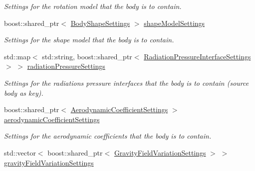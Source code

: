 \begin{DoxyCompactItemize}
\begin{DoxyCompactList}\small\item\em Settings for the rotation model that the body is to contain. \end{DoxyCompactList}\item 
boost\+::shared\+\_\+ptr$<$ \hyperlink{classtudat_1_1simulation__setup_1_1BodyShapeSettings}{Body\+Shape\+Settings} $>$ \hyperlink{structtudat_1_1simulation__setup_1_1BodySettings_aa8d0e84df13485b5f3c82c9b982ec5f0}{shape\+Model\+Settings}\hypertarget{structtudat_1_1simulation__setup_1_1BodySettings_aa8d0e84df13485b5f3c82c9b982ec5f0}{}\label{structtudat_1_1simulation__setup_1_1BodySettings_aa8d0e84df13485b5f3c82c9b982ec5f0}

\begin{DoxyCompactList}\small\item\em Settings for the shape model that the body is to contain. \end{DoxyCompactList}\item 
std\+::map$<$ std\+::string, boost\+::shared\+\_\+ptr$<$ \hyperlink{classtudat_1_1simulation__setup_1_1RadiationPressureInterfaceSettings}{Radiation\+Pressure\+Interface\+Settings} $>$ $>$ \hyperlink{structtudat_1_1simulation__setup_1_1BodySettings_a5e3ed3e841f455d2e013cf86257a39e0}{radiation\+Pressure\+Settings}\hypertarget{structtudat_1_1simulation__setup_1_1BodySettings_a5e3ed3e841f455d2e013cf86257a39e0}{}\label{structtudat_1_1simulation__setup_1_1BodySettings_a5e3ed3e841f455d2e013cf86257a39e0}

\begin{DoxyCompactList}\small\item\em Settings for the radiations pressure interfaces that the body is to contain (source body as key). \end{DoxyCompactList}\item 
boost\+::shared\+\_\+ptr$<$ \hyperlink{classtudat_1_1simulation__setup_1_1AerodynamicCoefficientSettings}{Aerodynamic\+Coefficient\+Settings} $>$ \hyperlink{structtudat_1_1simulation__setup_1_1BodySettings_ab5f5682fb9ab900be0873cbc0103973a}{aerodynamic\+Coefficient\+Settings}\hypertarget{structtudat_1_1simulation__setup_1_1BodySettings_ab5f5682fb9ab900be0873cbc0103973a}{}\label{structtudat_1_1simulation__setup_1_1BodySettings_ab5f5682fb9ab900be0873cbc0103973a}

\begin{DoxyCompactList}\small\item\em Settings for the aerodynamic coefficients that the body is to contain. \end{DoxyCompactList}\item 
std\+::vector$<$ boost\+::shared\+\_\+ptr$<$ \hyperlink{classtudat_1_1simulation__setup_1_1GravityFieldVariationSettings}{Gravity\+Field\+Variation\+Settings} $>$ $>$ \hyperlink{structtudat_1_1simulation__setup_1_1BodySettings_a7bd32a92aa3d7904d3b2a38b687e8189}{gravity\+Field\+Variation\+Settings}\hypertarget{structtudat_1_1simulation__setup_1_1BodySettings_a7bd32a92aa3d7904d3b2a38b687e8189}{}\label{structtudat_1_1simulation__setup_1_1BodySettings_a7bd32a92aa3d7904d3b2a38b687e8189}


\end{DoxyCompactItemize}
